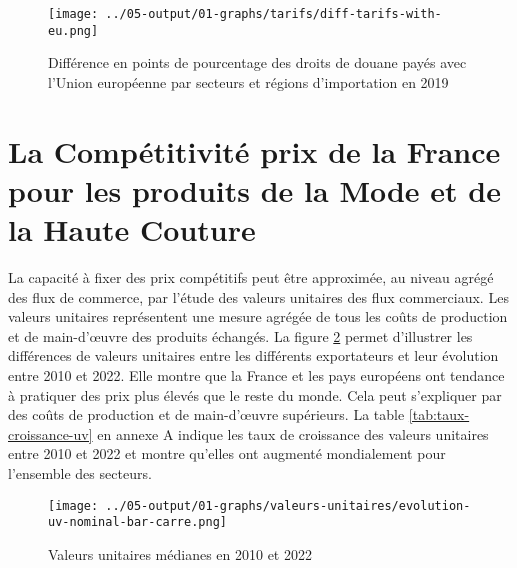 \documentclass[french,10pt,a4paper]{article}
\begin{document}
\begin{tcolorbox}[title=Encadré 1 : Droits de douane]
\begin{figure}[H] %
    \centering
    \texttt{[image: ../05-output/01-graphs/tarifs/diff-tarifs-with-eu.png]}
    \captionsetup{justification=raggedright, singlelinecheck=false, font=small}
    \caption*{Source : MAcMap-HS6, calcul des auteurs.}
    \captionsetup{justification=centering, singlelinecheck=true, font=normalsize}
    \caption{Différence en points de pourcentage des droits de douane payés avec l'Union européenne par secteurs et régions d'importation en 2019}
    \label{fig:diff-tarifs}
\end{figure}
  
\end{tcolorbox}



\newpage
{}
\section{La Compétitivité prix de la France pour les produits de la Mode et de la Haute Couture}
La capacité à fixer des prix compétitifs peut être approximée, au niveau agrégé des flux de commerce, par l'étude des valeurs unitaires des flux commerciaux. Les valeurs unitaires représentent une mesure agrégée de tous les coûts de production et de main-d'œuvre des produits échangés. La figure \ref{fig:valeurs-unitaires} permet d'illustrer les différences de valeurs unitaires entre les différents exportateurs et leur évolution entre 2010 et 2022. Elle montre que la France et les pays européens ont tendance à pratiquer des prix plus élevés que le reste du monde. Cela peut s'expliquer par des coûts de production et de main-d'œuvre supérieurs. La table \ref{tab:taux-croissance-uv} en annexe A indique les taux de croissance des valeurs unitaires entre 2010 et 2022 et montre qu'elles ont augmenté mondialement pour l'ensemble des secteurs.

\begin{figure}[!h]
  \centering
  \texttt{[image: ../05-output/01-graphs/valeurs-unitaires/evolution-uv-nominal-bar-carre.png]}
  \captionsetup{justification=justified, singlelinecheck=false, font=small}
  \caption*{Note : Les barres représentent les valeurs pour 2022, tandis que les carrés représentent les valeurs pour 2010. \\
  Note 2 : La Turquie a été retirée du graphique dans le secteur de la bijouterie pour des raisons de lisibilité. La valeur unitaire médiane de la Turquie en 2010 est de 80,4. En 2022, elle est de 5920,2. \\
  Source : BACI, calcul des auteurs.}
  \captionsetup{justification=centering, singlelinecheck=true, font=normalsize}
  \caption{Valeurs unitaires médianes en 2010 et 2022}
  \label{fig:valeurs-unitaires}
\end{figure}
\end{document}
